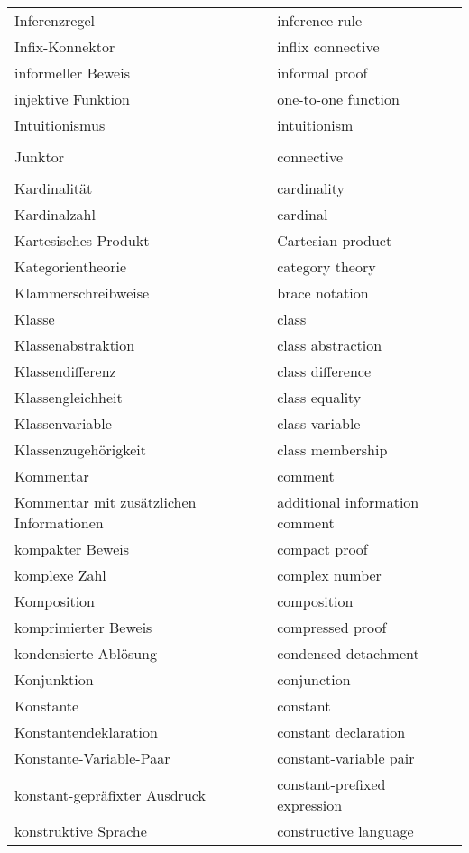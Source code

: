 \begin{longtabu}   { @{} X[l] X[l] }
    Inferenzregel & inference rule \\
    Infix-Konnektor & inflix connective \\
    informeller Beweis & informal proof \\
    injektive Funktion & one-to-one function \\
    Intuitionismus & intuitionism \\
     & \\
    Junktor & connective \\
     & \\
    Kardinalität & cardinality \\
    Kardinalzahl & cardinal \\
    Kartesisches Produkt & Cartesian product \\
    Kategorientheorie & category theory \\
    Klammerschreibweise & brace notation \\
    Klasse & class \\
    Klassenabstraktion & class abstraction \\
    Klassendifferenz & class difference \\
    Klassengleichheit & class equality \\
    Klassenvariable & class variable \\
    Klassenzugehörigkeit & class membership \\
    Kommentar & comment \\
    \hangindent=0.5cm Kommentar mit zusätzlichen Informationen\vspace{3pt} & additional information comment \\
    kompakter Beweis & compact proof \\
    komplexe Zahl & complex number \\
    Komposition & composition \\
    komprimierter Beweis & compressed proof \\
    kondensierte Ablösung & condensed detachment \\
    Konjunktion & conjunction \\
    Konstante & constant \\
    Konstantendeklaration & constant declaration \\
    Konstante-Variable-Paar & constant-variable pair \\
    konstant-gepräfixter Ausdruck & constant-prefixed expression \\
    konstruktive Sprache & constructive language \\

\end{longtabu}
